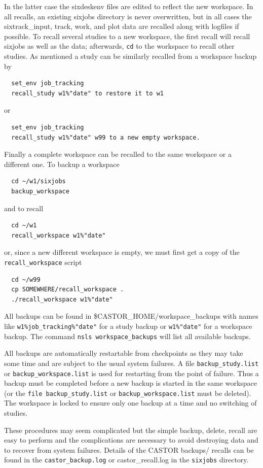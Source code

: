 \documentclass{cernatsnote}    %
\begin{document}
In the latter case the sixdeskenv files are edited to reflect the new
workspace. In all recalls, an 
existing sixjobs directory is never overwritten, but in all cases the 
sixtrack\_input, track, work, and plot data are recalled along with 
logfiles if possible.
 To recall several studies to a new workspace, the first recall will
recall sixjobs as well as the data; afterwards, {\tt cd} to the workspace
to recall other studies.
 As mentioned a study can be similarly recalled from a workspace backup by
\begin{verbatim}
  set_env job_tracking
  recall_study w1%"date" to restore it to w1 
\end{verbatim}
or 
\begin{verbatim}
  set_env job_tracking
  recall_study w1%"date" w99 to a new empty workspace.
\end{verbatim}
 Finally a complete workspace can be recalled to the same workspace or a
different one.
To backup a workspace
\begin{verbatim} 
  cd ~/w1/sixjobs 
  backup_workspace
\end{verbatim}
and to recall
\begin{verbatim}
  cd ~/w1
  recall_workspace w1%"date"
\end{verbatim}
or, since a new different workspace is empty, we must first
get a copy of the {\tt recall\_workspace} script  
\begin{verbatim}
  cd ~/w99
  cp SOMEWHERE/recall_workspace .
  ./recall_workspace w1%"date"
\end{verbatim}

 All backups can be found in \$CASTOR\_HOME/workspace\_backups with names like
{\tt w1\%job\_tracking\%"date"} for a study backup
or
{\tt w1\%"date"} for a workspace backup.
The command {\tt nsls workspace\_backups} will list all available backups.

 All backups are automatically restartable from checkpoints as they may take
some time and are subject to the usual system failures. A file 
{\tt backup\_study.list} or {\tt backup\_workspace.list} is used for restarting
from the point of failure. Thus a backup must be completed before a new
backup is started in the same workspace (or the {\tt file backup\_study.list} or
{\tt backup\_workspace.list} must be deleted). The workspace is locked to ensure
only one backup at a time and no switching of studies.

 These procedures may seem complicated but the simple backup, delete, recall
are easy to perform and the complications are necessary to avoid destroying
data and to recover from system failures. Details of the CASTOR backups/
recalls can be found in the {\tt castor\_backup.log} or {castor\_recall.log}
in the {\tt sixjobs} directory.
\end{document}
